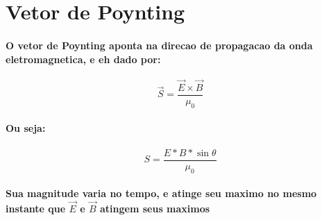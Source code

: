 \documentclass[12pt,twoside, a4paper, twocolumn]{article}
\begin{document}
\section{Vetor de Poynting}
\paragraph*{O vetor de Poynting aponta na direcao de propagacao da onda eletromagnetica, e eh dado por:}
\begin{equation}
    \vec{S} = \frac{\vec{E} \times \vec{B}}{\mu_0}
\end{equation}
\paragraph*{Ou seja:}
\begin{equation}
    S = \frac{E * B * \sin{\theta}}{\mu_0}
\end{equation}
\paragraph*{Sua magnitude varia no tempo, e atinge seu maximo no mesmo instante que $\vec{E}$ e $\vec{B}$ atingem seus maximos}
\end{document}
